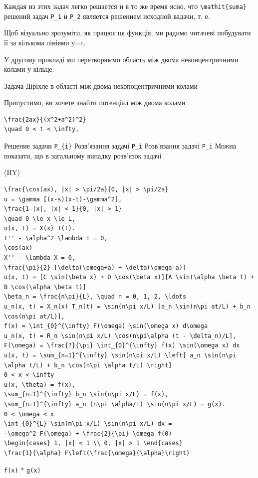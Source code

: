 \documentclass[
  ukrainian,
]{article}
\begin{document}
Каждая из этих задач легко решается и в то же время ясно, что
\texttt{\textbackslash{}mathit\{suma\}} решений задач \texttt{P\_1} и
\texttt{P\_2} является решением исходной вадачи, т. е.

Щоб візуально зрозуміти, як працює ця функція, ми радимо читачеві
побудувати її за кількома лініями y=c.

У другому прикладі ми перетворюємо область між двома неконцентричними
колами у кільце.

Задача Діріхле в області між двома некопоцентричними колами

Припустимо, ви хочете знайти потенціал між двома колами

\begin{verbatim}
\frac{2ax}{(x^2+a^2)^2}
\quad 0 < t < \infty,
\end{verbatim}

Решение задачи \texttt{P\_\{i\}} Розв'язання задачі \texttt{P\_i}
Розв'язання задачі \texttt{P\_i} Можна показати, що в загальному випадку
розв'язок задачі

(HY)

\begin{verbatim}
\frac{\cos(ax), |x| > \pi/2a}{0, |x| > \pi/2a}
u = \gamma [(x-s)(x-t)-\gamma^2],
\frac{1-|x|, |x| < 1}{0, |x| > 1}
\quad 0 \le x \le L,
u(x, t) = X(x) T(t).
T'' - \alpha^2 \lambda T = 0,
\cos(ax)
X'' - \lambda X = 0,
\frac{\pi}{2} [\delta(\omega+a) + \delta(\omega-a)]
u(x, t) = [C \sin(\beta x) + D \cos(\beta x)][A \sin(\alpha \beta t) + B \cos(\alpha \beta t)]
\beta_n = \frac{n\pi}{L}, \quad n = 0, 1, 2, \ldots
u_n(x, t) = X_n(x) T_n(t) = \sin(n\pi x/L) [a_n \sin(n\pi at/L) + b_n \cos(n\pi at/L)],
f(x) = \int_{0}^{\infty} F(\omega) \sin(\omega x) d\omega
u_n(x, t) = R_n \sin(n\pi x/L) \cos(n\pi\alpha (t - \delta_n)/L],
F(\omega) = \frac{?}{\pi} \int_{0}^{\infty} f(x) \sin(\omega x) dx
u(x, t) = \sum_{n=1}^{\infty} \sin(n\pi x/L) \left[ a_n \sin(n\pi \alpha t/L) + b_n \cos(n\pi \alpha t/L) \right]
0 < x < \infty
u(x, \theta) = f(x),
\sum_{n=1}^{\infty} b_n \sin(n\pi x/L) = f(x),
\sum_{n=1}^{\infty} a_n (n\pi \alpha/L) \sin(n\pi x/L) = g(x).
0 < \omega < x
\int_{0}^{L} \sin(m\pi x/L) \sin(n\pi x/L) dx =
-\omega^2 F(\omega) + \frac{2}{\pi} \omega f(0)
\begin{cases} 1, |x| < 1 \\ 0, |x| > 1 \end{cases}
\frac{1}{\alpha} F\left(\frac{\omega}{\alpha}\right)
\end{verbatim}

\texttt{f(x)} * \texttt{g(x)}
\end{document}
